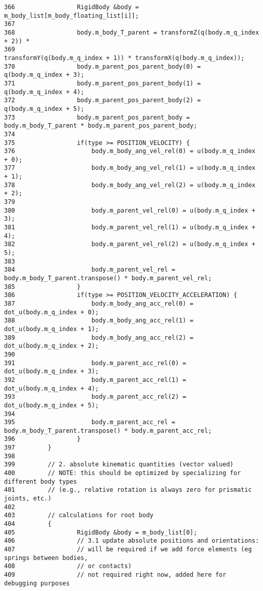 \begin{Code}
\begin{verbatim}
366                 RigidBody &body = m_body_list[m_body_floating_list[i]];
367 
368                 body.m_body_T_parent = transformZ(q(body.m_q_index + 2)) *
369                                                            transformY(q(body.m_q_index + 1)) * transformX(q(body.m_q_index));
370                 body.m_parent_pos_parent_body(0) = q(body.m_q_index + 3);
371                 body.m_parent_pos_parent_body(1) = q(body.m_q_index + 4);
372                 body.m_parent_pos_parent_body(2) = q(body.m_q_index + 5);
373                 body.m_parent_pos_parent_body = body.m_body_T_parent * body.m_parent_pos_parent_body;
374 
375                 if(type >= POSITION_VELOCITY) {
376                     body.m_body_ang_vel_rel(0) = u(body.m_q_index + 0);
377                     body.m_body_ang_vel_rel(1) = u(body.m_q_index + 1);
378                     body.m_body_ang_vel_rel(2) = u(body.m_q_index + 2);
379 
380                     body.m_parent_vel_rel(0) = u(body.m_q_index + 3);
381                     body.m_parent_vel_rel(1) = u(body.m_q_index + 4);
382                     body.m_parent_vel_rel(2) = u(body.m_q_index + 5);
383 
384                     body.m_parent_vel_rel = body.m_body_T_parent.transpose() * body.m_parent_vel_rel;
385                 }
386                 if(type >= POSITION_VELOCITY_ACCELERATION) {
387                     body.m_body_ang_acc_rel(0) = dot_u(body.m_q_index + 0);
388                     body.m_body_ang_acc_rel(1) = dot_u(body.m_q_index + 1);
389                     body.m_body_ang_acc_rel(2) = dot_u(body.m_q_index + 2);
390 
391                     body.m_parent_acc_rel(0) = dot_u(body.m_q_index + 3);
392                     body.m_parent_acc_rel(1) = dot_u(body.m_q_index + 4);
393                     body.m_parent_acc_rel(2) = dot_u(body.m_q_index + 5);
394 
395                     body.m_parent_acc_rel = body.m_body_T_parent.transpose() * body.m_parent_acc_rel;
396                 }
397         }
398 
399         // 2. absolute kinematic quantities (vector valued)
400         // NOTE: this should be optimized by specializing for different body types
401         // (e.g., relative rotation is always zero for prismatic joints, etc.)
402 
403         // calculations for root body
404         {
405                 RigidBody &body = m_body_list[0];
406                 // 3.1 update absolute positions and orientations:
407                 // will be required if we add force elements (eg springs between bodies,
408                 // or contacts)
409                 // not required right now, added here for debugging purposes

\end{verbatim}
\end{Code}

